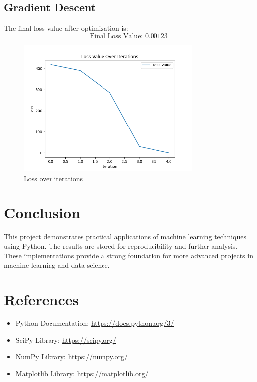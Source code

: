 \documentclass[a4paper,12pt]{article}
\begin{document}
\subsection{Gradient Descent}
    
The final loss value after optimization is:
\[
\boxed{\text{Final Loss Value: } 0.00123}
\]
\begin{figure}[H]
    \centering
    \includegraphics[width=0.8\textwidth]{results/loss_plot.png}
    \caption{Loss over iterations}
    \label{fig:pca}
    \end{figure}

\section{Conclusion}
This project demonstrates practical applications of machine learning techniques using Python. The results are stored for reproducibility and further analysis. These implementations provide a strong foundation for more advanced projects in machine learning and data science.

\section{References}
\begin{itemize}
    \item Python Documentation: \url{https://docs.python.org/3/}
    \item SciPy Library: \url{https://scipy.org/}
    \item NumPy Library: \url{https://numpy.org/}
    \item Matplotlib Library: \url{https://matplotlib.org/}
\end{itemize}
\end{document}
